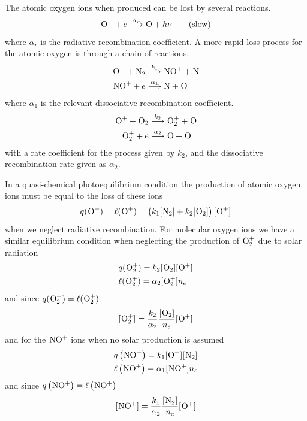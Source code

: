 The atomic oxygen ions when produced can be lost by several reactions. 
\begin{equation*}
    \prescript{}{}{\textnormal{O}}^++e\overset{\alpha_r}{\longrightarrow}\prescript{}{}{\textnormal{O}}+h\nu\qquad\textnormal{(slow)}
\end{equation*}
where \(\alpha_r\) is the radiative recombination coefficient. A more rapid loss process for the atomic oxygen is through a chain of reactions. 
\begin{align*}
    \prescript{}{}{\textnormal{O}}^++\prescript{}{}{\textnormal{N}}_2&\overset{k_1}{\longrightarrow}\prescript{}{}{\textnormal{NO}}^++\prescript{}{}{\textnormal{N}}\\
    \prescript{}{}{\textnormal{NO}}^++e&\overset{\alpha_1}{\longrightarrow}\prescript{}{}{\textnormal{N}}+\prescript{}{}{\textnormal{O}}
\end{align*}
where \(\alpha_1\) is the relevant dissociative recombination coefficient. 
\begin{align*}
    \prescript{}{}{\textnormal{O}}^++\prescript{}{}{\textnormal{O}}_2&\overset{k_2}{\longrightarrow}\prescript{}{}{\textnormal{O}}_2^++\prescript{}{}{\textnormal{O}}\\
    \prescript{}{}{\textnormal{O}}_2^++e&\overset{\alpha_2}{\longrightarrow}\prescript{}{}{\textnormal{O}}+\prescript{}{}{\textnormal{O}}
\end{align*}
with a rate coefficient for the process given by \(k_2\), and the dissociative recombination rate given as \(\alpha_2\).

In a quasi-chemical photoequilibrium condition the production of atomic oxygen ions must be equal to the loss of these ions
\begin{equation*}
    q(\prescript{}{}{\textnormal{O}}^+)=\ell(\prescript{}{}{\textnormal{O}}^+)=\left(k_1[\prescript{}{}{\textnormal{N}}_2]+k_2[\prescript{}{}{\textnormal{O}}_2]\right)[\prescript{}{}{\textnormal{O}}^+]
\end{equation*}
when we neglect radiative recombination. For molecular oxygen ions we have a similar equilibrium condition when neglecting the production of \(\prescript{}{}{\textnormal{O}}_2^+\) due to solar radiation
\begin{align*}
    &q(\prescript{}{}{\textnormal{O}}_2^+)=k_2[\prescript{}{}{\textnormal{O}}_2][\prescript{}{}{\textnormal{O}}^+]\\
    &\ell(\prescript{}{}{\textnormal{O}}_2^+)=\alpha_2 [\prescript{}{}{\textnormal{O}}_2^+]n_e
\end{align*}
and since \(q(\prescript{}{}{\textnormal{O}}_2^+)=\ell(\prescript{}{}{\textnormal{O}}_2^+)\)
\begin{equation}\label{eq:L10_production_O_2}
    [\prescript{}{}{\textnormal{O}}_2^+]=\frac{k_2}{\alpha_2}\frac{[\prescript{}{}{\textnormal{O}}_2]}{n_e}[\prescript{}{}{\textnormal{O}}^+]
\end{equation}
and for the \(\prescript{}{}{\textnormal{NO}}^+\) ions when no solar production is assumed
\begin{align*}
    &q\left(\prescript{}{}{\textnormal{NO}}^+\right)=k_1[\prescript{}{}{\textnormal{O}}^+][\prescript{}{}{\textnormal{N}}_2]\\
    &\ell\left(\prescript{}{}{\textnormal{NO}}^+\right)=\alpha_1 [\prescript{}{}{\textnormal{NO}}^+]n_e
\end{align*}
and since \(q\left(\prescript{}{}{\textnormal{NO}}^+\right)=\ell\left(\prescript{}{}{\textnormal{NO}}^+\right)\)
\begin{equation}\label{eq:L10_production_NO}
    [\prescript{}{}{\textnormal{NO}}^+]=\frac{k_1}{\alpha_2}\frac{[\prescript{}{}{\textnormal{N}}_2]}{n_e}[\prescript{}{}{\textnormal{O}}^+]
\end{equation}

